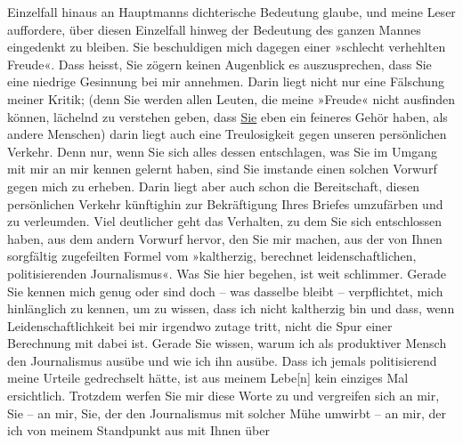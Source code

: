 \begin{ledgroupsized}[t]{13cm}
               Einzelfall hinaus an Hauptmanns dichterische
               Bedeutung glaube, und meine Leser auffordere, über diesen Einzelfall hinweg der
               Bedeutung des ganzen Mannes
               eingedenkt zu bleiben.\pend
           \pstart
           Sie beschuldigen mich dagegen einer »schlecht verhehlten Freude«. Dass heisst, Sie
               zögern keinen Augenblick es auszu{\pb}sprechen, dass Sie eine
               niedrige Gesinnung bei mir annehmen. Darin liegt nicht nur eine Fälschung meiner
               Kritik; (denn Sie werden allen Leuten, die meine »Freude« nicht ausfinden können,
               lächelnd zu verstehen geben, dass \uline{Sie} eben ein
               feineres Gehör haben, als andere Menschen) darin liegt auch eine Treulosigkeit gegen
               unseren persönlichen Verkehr. Denn nur, wenn Sie sich alles dessen entschlagen, was
               Sie im Umgang mit mir an mir kennen gelernt haben, sind Sie imstande einen solchen
               Vorwurf gegen mich zu erheben. Darin liegt aber auch schon die Bereitschaft, diesen
               persönlichen Verkehr künftighin zur Bekräftigung Ihres Briefes umzufärben und zu
               verleumden.\pend
           \pstart
           Viel deutlicher geht das Verhalten, zu dem Sie sich entschlossen haben, aus dem
               andern Vorwurf hervor, den Sie mir machen, aus der von Ihnen sorgfältig zugefeilten
               Formel vom »kaltherzig, berechnet leidenschaftlichen, politisierenden Journalismus«.
               Was Sie hier begehen, ist weit schlimmer. Gerade Sie kennen mich genug oder sind doch
               – was dasselbe bleibt – verpflichtet, mich hinlänglich zu kennen, um zu wissen, dass
               ich nicht kaltherzig bin und dass, wenn Leidenschaftlichkeit bei mir irgendwo zutage
               tritt, nicht die Spur einer Berechnung mit dabei ist. Gerade Sie wissen, warum ich
               als produktiver Mensch den Journalismus ausübe und wie ich ihn ausübe. Dass ich
               jemals politisierend meine Urteile gedrechselt hätte, ist aus meinem
                  Lebe{[}n{]} kein einziges Mal ersichtlich. Trotzdem werfen Sie mir
               diese Worte zu und vergreifen sich an mir, Sie – an mir, Sie, der den Journalismus
               mit solcher Mühe umwirbt – an mir, der ich von meinem Standpunkt aus mit Ihnen über

\end{ledgroupsized}
